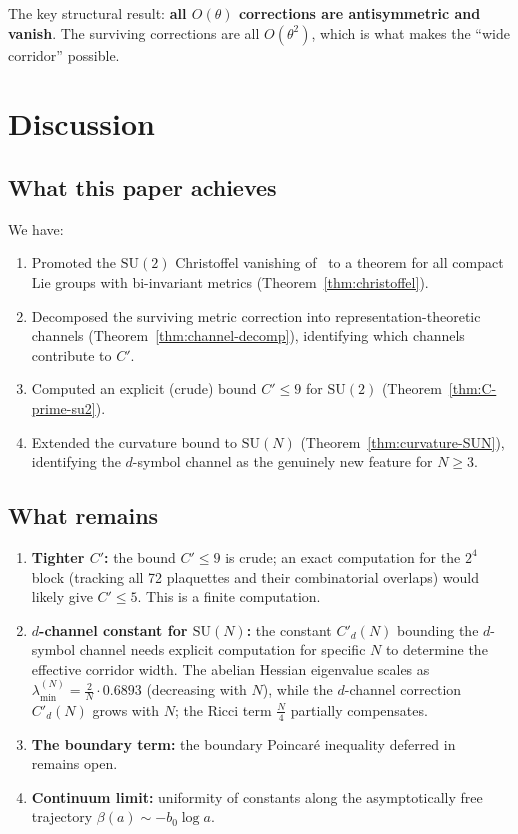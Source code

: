 \documentclass[11pt,a4paper]{article}
\theoremstyle{plain}
\theoremstyle{definition}
\theoremstyle{remark}
\newcommand{\SU}{\mathrm{SU}}
\begin{document}
The key structural result: \textbf{all $O(\theta)$ corrections
are antisymmetric and vanish}. The surviving corrections are all
$O(\theta^2)$, which is what makes the ``wide corridor''
possible.


\section{Discussion}\label{sec:discussion}

\subsection{What this paper achieves}

We have:
\begin{enumerate}[label=(\roman*)]
\item Promoted the $\SU(2)$ Christoffel vanishing
  of~\cite{Fontes2026Paper8} to a theorem for all compact Lie
  groups with bi-invariant metrics
  (Theorem~\ref{thm:christoffel}).
\item Decomposed the surviving metric correction into
  representation-theoretic channels
  (Theorem~\ref{thm:channel-decomp}), identifying which channels
  contribute to $C'$.
\item Computed an explicit (crude) bound $C' \leq 9$ for
  $\SU(2)$ (Theorem~\ref{thm:C-prime-su2}).
\item Extended the curvature bound to $\SU(N)$
  (Theorem~\ref{thm:curvature-SUN}), identifying the $d$-symbol
  channel as the genuinely new feature for $N \geq 3$.
\end{enumerate}

\subsection{What remains}

\begin{enumerate}[label=(\alph*)]
\item \textbf{Tighter $C'$:} the bound $C' \leq 9$ is crude;
  an exact computation for the $2^4$ block (tracking all 72
  plaquettes and their combinatorial overlaps) would likely give
  $C' \leq 5$. This is a finite computation.
\item \textbf{$d$-channel constant for $\SU(N)$:} the constant
  $C'_d(N)$ bounding the $d$-symbol channel needs explicit
  computation for specific $N$ to determine the effective
  corridor width. The abelian Hessian eigenvalue scales as
  $\lambda_{\min}^{(N)} = \frac{2}{N}\cdot 0.6893$
  (decreasing with $N$), while the $d$-channel correction
  $C'_d(N)$ grows with $N$; the Ricci term $\frac{N}{4}$
  partially compensates.
\item \textbf{The boundary term:} the boundary Poincar\'e
  inequality deferred in~\cite{Fontes2026Paper8} remains open.
\item \textbf{Continuum limit:} uniformity of constants along
  the asymptotically free trajectory $\beta(a) \sim -b_0 \log a$.
\end{enumerate}
\end{document}
